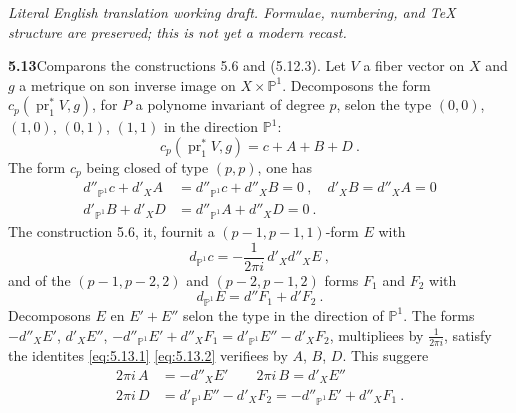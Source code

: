 \documentclass[12pt,a4paper]{article}
\theoremstyle{plain}
\theoremstyle{definition}
\theoremstyle{remark}
\newcommand{\bbP}{\mathbb{P}}
\DeclareMathOperator{\pr}{pr}
\begin{document}
\begin{center}\small\emph{Literal English translation working draft. Formulae, numbering, and TeX structure are preserved; this is not yet a modern recast.}\end{center}
\vspace{0.5em}

\setcounter{section}{5}


\noindent\textbf{5.13}\quad Comparons the constructions 5.6 and (5.12.3). Let $V$ a fiber vector on $X$ and $g$ a metrique on son inverse image on $X \times \bbP^1$. Decomposons the form $c_p(\pr_1^*V, g)$, for $P$ a polynome invariant of degree $p$, selon the type $(0,0)$, $(1,0)$, $(0,1)$, $(1,1)$ in the direction $\bbP^1$:
\[
c_p(\pr_1^*V, g) = c + A + B + D \ .
\]
The form $c_p$ being closed of type $(p,p)$, one has
\begin{align}
\label{eq:5.13.1}
d''_{\bbP^1}c + d'_X A &= d''_{\bbP^1} c + d''_X B = 0 \ , \quad d'_X B = d''_X A = 0 \\
\label{eq:5.13.2}
d'_{\bbP^1} B + d'_X D &= d''_{\bbP^1} A + d''_X D = 0 \ .
\end{align}
The construction 5.6, it, fournit a $(p-1, p-1, 1)$-form $E$ with
\begin{equation}
\label{eq:5.13.3}
d_{\bbP^1} c = -\frac{1}{2\pi i} \, d'_X d''_X E \ ,
\end{equation}
and of the $(p-1, p-2, 2)$ and $(p-2, p-1, 2)$ forms $F_1$ and $F_2$ with
\begin{equation}
\label{eq:5.13.4}
d_{\bbP^1} E = d''F_1 + d'F_2 \ .
\end{equation}
Decomposons $E$ en $E' + E''$ selon the type in the direction of $\bbP^1$. The forms $-d''_X E'$, $d'_X E''$, $-d''_{\bbP^1}E' + d''_X F_1 = d'_{\bbP^1}E'' - d'_X F_2$, multipliees by $\frac{1}{2\pi i}$, satisfy the identites \eqref{eq:5.13.1} \eqref{eq:5.13.2} verifiees by $A$, $B$, $D$. This suggere
\begin{equation}
\label{eq:5.13.5}
\begin{aligned}
2\pi i \, A &= -d''_X E' \qquad 2\pi i \, B = d'_X E'' \\
2\pi i \, D &= d'_{\bbP^1}E'' - d'_X F_2 = -d''_{\bbP^1}E' + d''_X F_1 \ .
\end{aligned}
\end{equation}
\end{document}

